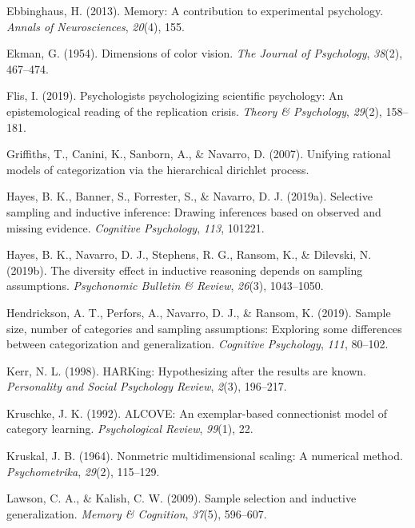 \documentclass[english,doc]{apa6}
\begin{document}
\leavevmode\hypertarget{ref-ebbinghaus2013memory}{}%
Ebbinghaus, H. (2013). Memory: A contribution to experimental psychology. \emph{Annals of Neurosciences}, \emph{20}(4), 155.

\leavevmode\hypertarget{ref-ekman1954dimensions}{}%
Ekman, G. (1954). Dimensions of color vision. \emph{The Journal of Psychology}, \emph{38}(2), 467--474.

\leavevmode\hypertarget{ref-Flis2019}{}%
Flis, I. (2019). Psychologists psychologizing scientific psychology: An epistemological reading of the replication crisis. \emph{Theory \& Psychology}, \emph{29}(2), 158--181.

\leavevmode\hypertarget{ref-griffiths2007unifying}{}%
Griffiths, T., Canini, K., Sanborn, A., \& Navarro, D. (2007). Unifying rational models of categorization via the hierarchical dirichlet process.

\leavevmode\hypertarget{ref-hayes2019selective}{}%
Hayes, B. K., Banner, S., Forrester, S., \& Navarro, D. J. (2019a). Selective sampling and inductive inference: Drawing inferences based on observed and missing evidence. \emph{Cognitive Psychology}, \emph{113}, 101221.

\leavevmode\hypertarget{ref-hayes2019diversity}{}%
Hayes, B. K., Navarro, D. J., Stephens, R. G., Ransom, K., \& Dilevski, N. (2019b). The diversity effect in inductive reasoning depends on sampling assumptions. \emph{Psychonomic Bulletin \& Review}, \emph{26}(3), 1043--1050.

\leavevmode\hypertarget{ref-hendrickson2019sample}{}%
Hendrickson, A. T., Perfors, A., Navarro, D. J., \& Ransom, K. (2019). Sample size, number of categories and sampling assumptions: Exploring some differences between categorization and generalization. \emph{Cognitive Psychology}, \emph{111}, 80--102.

\leavevmode\hypertarget{ref-kerr1998harking}{}%
Kerr, N. L. (1998). HARKing: Hypothesizing after the results are known. \emph{Personality and Social Psychology Review}, \emph{2}(3), 196--217.

\leavevmode\hypertarget{ref-kruschke1992alcove}{}%
Kruschke, J. K. (1992). ALCOVE: An exemplar-based connectionist model of category learning. \emph{Psychological Review}, \emph{99}(1), 22.

\leavevmode\hypertarget{ref-kruskal1964nonmetric}{}%
Kruskal, J. B. (1964). Nonmetric multidimensional scaling: A numerical method. \emph{Psychometrika}, \emph{29}(2), 115--129.

\leavevmode\hypertarget{ref-lawson2009sample}{}%
Lawson, C. A., \& Kalish, C. W. (2009). Sample selection and inductive generalization. \emph{Memory \& Cognition}, \emph{37}(5), 596--607.
\end{document}
